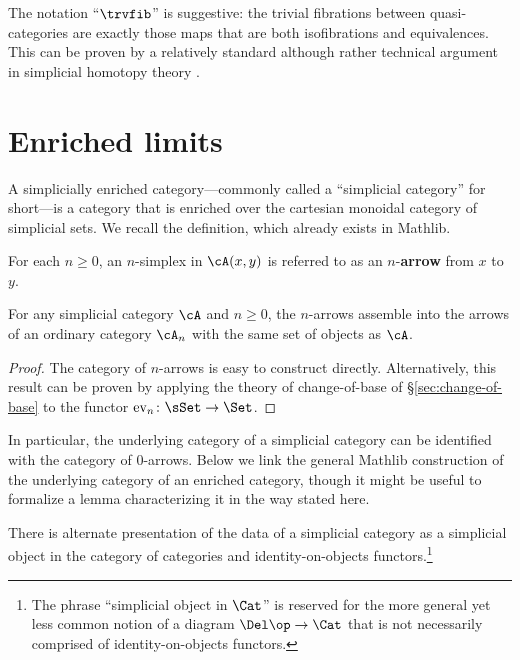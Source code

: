   The notation ``$\trvfib$'' is suggestive: the trivial fibrations between quasi-cat\-e\-go\-ries are exactly those maps that are both isofibrations and equivalences. This can be proven by a relatively standard although rather technical argument in simplicial homotopy theory \cite[D.5.6]{RiehlVerity:2022eo}.

\section{Enriched limits}\label{sec:enriched-limits}

A simplicially enriched category---commonly called a ``simplicial category'' for short---is a category that is enriched over the cartesian monoidal category of simplicial sets. We recall the definition, which already exists in Mathlib.


\begin{definition}\label{defn:n-arrow}
For each $n \geq 0$, an $n$-simplex in $\cA(x,y)$ is referred to as an $n$-\textbf{arrow} from $x$ to $y$.
\end{definition}

\begin{lemma}\label{lem:cat-of-n-arrows} For any simplicial category $\cA$ and $n \geq 0$,
the $n$-arrows assemble into the arrows of an ordinary category $\cA_n$ with the same set of objects as $\cA$.
\end{lemma}
\begin{proof}
The category of $n$-arrows is easy to construct directly. Alternatively, this result can be proven by applying the theory of change-of-base of \S\ref{sec:change-of-base} to the functor $\textup{ev}_n \colon \sSet \to \Set$.
\end{proof}

In particular, the underlying category of a simplicial category can be identified with the category of $0$-arrows. Below we link the general Mathlib construction of the underlying category of an enriched category, though it might be useful to formalize a lemma characterizing it in the way stated here.


There is alternate presentation of the data of a simplicial category as a simplicial object in the category of categories and identity-on-objects functors.\footnote{The phrase ``simplicial object in $\Cat$'' is reserved for the more general yet less common notion of a diagram $\Del\op\to\Cat$ that is not necessarily comprised of identity-on-objects functors.}


